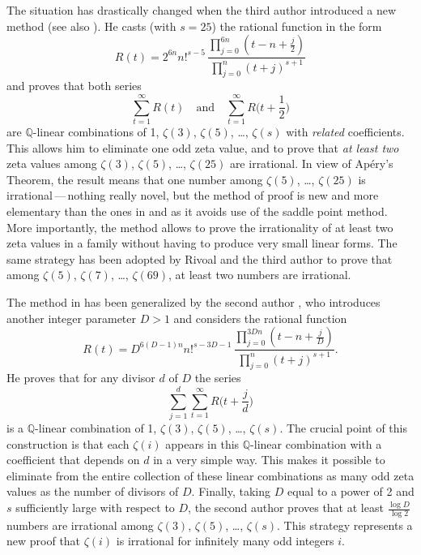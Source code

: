 \documentclass{article}
\numberwithin{equation}{section}
\theoremstyle{remark}
\newcommand{\Q}{\mathbb{Q}}
\begin{document}
The situation has drastically changed when the third author introduced \cite{Zudilintrick} a new method (see also \cite{KrattZ}). He casts (with $s=25$) the rational function in the form
$$ R(t) =  2^{6n}n!^{s-5}\, \frac{\prod_{j=0}^{6n} (t-n+\frac{j}{2})}{ \prod_{j=0}^{ n} (t+j)^{s+1}}$$
and proves that both series 
$$\sum_{t=1}^\infty R(t) \quad\mbox{and}\quad \sum_{t=1}^\infty R\Big(t+\frac12\Big)$$
are $\Q$-linear combinations of 1, $\zeta(3)$, $\zeta(5)$, \ldots, $\zeta(s)$ with {\em related\/} coefficients.
This allows him to eliminate one odd zeta value, and to prove that {\em at least two} zeta values among $\zeta(3)$, $\zeta(5)$, \ldots, $\zeta(25)$ are irrational. In view of Ap\'ery's Theorem, the result means that one number among $\zeta(5)$, \ldots, $\zeta(25)$ is irrational\,---\,nothing really novel, but the method of proof is new and more elementary
than the ones in \cite{vingtetun} and \cite{Zudilinonze}
as it avoids use of the saddle point method. More importantly, the method allows to prove the irrationality of at least two zeta values in a family without having to produce very small linear forms.
The same strategy has been adopted by Rivoal and the third author \cite{RZnote} to prove that among $\zeta(5)$, $\zeta(7)$, \ldots, $\zeta(69)$, at least two numbers are irrational.
 
\bigskip

The method in \cite{Zudilintrick} has been generalized by the second author \cite{Sprang}, who introduces another integer parameter $D>1$ and considers the rational function
\begin{equation}\label{eqSprang}
R(t) = D^{6(D-1)n}n!^{s-3D-1}\,\frac{ \prod_{j=0}^{3Dn} (t-n+\frac{j}{D})}{ \prod_{j=0}^{ n} (t+j)^{s+1}}.
\end{equation}
He proves that for any divisor $d$ of $D$ the series
$$\sum_{j=1}^d \sum_{t=1}^\infty R\Big(t+\frac{j}{d}\Big)$$
is a $\Q$-linear combination of 1, $\zeta(3)$, $\zeta(5)$, \ldots, $\zeta(s)$.
The crucial point of this construction is that each $\zeta(i)$ appears in this $\Q$-linear combination with a coefficient that depends on $d$ in a very simple way. This makes it possible to eliminate from the entire collection of these linear combinations as many odd zeta values as the number of divisors of $D$. Finally, taking $D$ equal to a power of 2 and $s$ sufficiently large with respect to $D$, the second author proves that at least $\frac{\log D}{\log 2}$ numbers are irrational among $\zeta(3)$, $\zeta(5)$, \ldots, $\zeta(s)$. This strategy represents a new proof that $\zeta(i)$ is irrational for infinitely many odd integers $i$.
\end{document}
